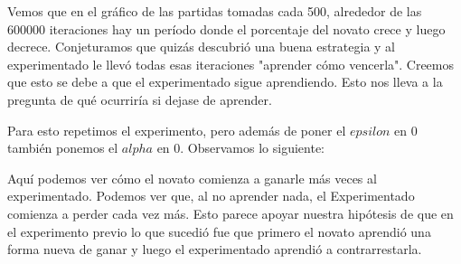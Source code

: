 Vemos que en el gráfico de las partidas tomadas cada 500, alrededor de las 600000 iteraciones hay un período donde el porcentaje del novato crece y luego decrece. Conjeturamos que quizás descubrió una buena estrategia y al experimentado le llevó todas esas iteraciones "aprender cómo vencerla". Creemos que esto se debe a que el experimentado sigue aprendiendo. Esto nos lleva a la pregunta de qué ocurriría si dejase de aprender.

Para esto repetimos el experimento, pero además de poner el $epsilon$ en 0 también ponemos el $alpha$ en 0. Observamos lo siguiente:



Aquí podemos ver cómo el novato comienza a ganarle más veces al experimentado. Podemos ver que, al no aprender nada, el Experimentado comienza a perder cada vez más. Esto parece apoyar nuestra hipótesis de que en el experimento previo lo que sucedió fue que primero el novato aprendió una forma nueva de ganar y luego el experimentado aprendió a contrarrestarla.
